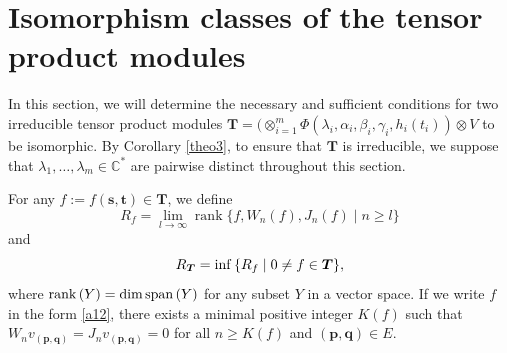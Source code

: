 \documentclass[12pt,leqno,amscd,amsfonts,amssymb]{amsart}
\def\b{\beta}
\def\r{\gamma}
\def\C{\mathbb{C}}
\numberwithin{equation}{section}
\begin{document}
\section{Isomorphism classes of the tensor product modules}
In this section, we will determine the necessary and sufficient conditions for two irreducible tensor product modules $\bm{T}=(\otimes_{i=1}^{m}\Phi(\lambda_i, \alpha_i, \b_i, \r_i, h_i(t_i))\otimes V$ to be isomorphic. By Corollary \ref{theo3}, to ensure that $\bm{T}$ is irreducible, we suppose that $\lambda_1, \ldots, \lambda_m\in\C^*$ are pairwise distinct throughout this section. 

For any $f:=f(\mathbf{s}, \mathbf{t})\in \bm{T}$, we define
\begin{equation*} 
R_f = \lim\limits_{l\to\infty} \operatorname{rank} \{f, W_n(f), J_n(f)\mid n\ge l\}
\end{equation*}
and
$$R_{\bm{T}} = {\rm inf\,}\{R_{f}\mid 0\neq f\in \bm{T}\},$$
where ${\rm rank\,}(Y)={\rm dim\,}{\rm span\,}(Y)$ for any subset $Y$ in a vector space. If we write  $f$ in the form \eqref{a12}, there exists a minimal positive integer $K(f)$ such that $W_nv_{(\mathbf{p}, \mathbf{q})}=J_nv_{(\mathbf{p}, \mathbf{q})}=0$ for all $n\geq K(f)$ and $(\mathbf{p}, \mathbf{q})\in E$.
\end{document}
